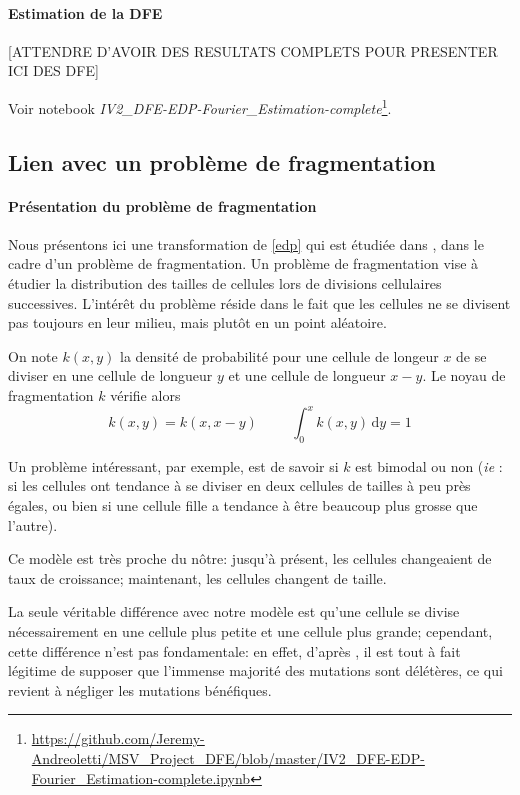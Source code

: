 \documentclass[12pt]{article}
\newcommand{\esp}{\hspace{1cm}}
\newcommand{\ie}{\emph{ie} }
\newcommand{\de}{\,\mathrm{d}}
\begin{document}
\paragraph{Estimation de la DFE}

[ATTENDRE D'AVOIR DES RESULTATS COMPLETS POUR PRESENTER ICI DES DFE]

Voir notebook \emph{IV2\_DFE-EDP-Fourier\_Estimation-complete}\footnote{\url{https://github.com/Jeremy-Andreoletti/MSV_Project_DFE/blob/master/IV2_DFE-EDP-Fourier_Estimation-complete.ipynb}}.

\subsection{Lien avec un problème de fragmentation}

\paragraph{Présentation du problème de fragmentation}
Nous présentons ici une transformation de \eqref{edp} qui est étudiée dans \cite{md1}, \cite{md2} dans le cadre d'un problème de fragmentation. Un problème de fragmentation vise à étudier la distribution des tailles de cellules lors de divisions cellulaires successives. L'intérêt du problème réside dans le fait que les cellules ne se divisent pas toujours en leur milieu, mais plutôt en un point aléatoire.

On note $k(x,y)$ la densité de probabilité pour une cellule de longeur $x$ de se diviser en une cellule de longueur $y$ et une cellule de longueur $x-y$. Le noyau de fragmentation $k$ vérifie alors \[k(x,y)=k(x,x-y)\esp \int_0^xk(x,y)\de y=1\]

Un problème intéressant, par exemple, est de savoir si $k$ est bimodal ou non (\ie: si les cellules ont tendance à se diviser en deux cellules de tailles à peu près égales, ou bien si une cellule fille a tendance à être beaucoup plus grosse que l'autre).

Ce modèle est très proche du nôtre: jusqu'à présent, les cellules changeaient de taux de croissance; maintenant, les cellules changent de taille.

La seule véritable différence avec notre modèle est qu'une cellule se divise nécessairement en une cellule plus petite et une cellule plus grande; cependant, cette différence n'est pas fondamentale: en effet, d'après \cite{rob}, il est tout à fait légitime de supposer que l'immense majorité des mutations sont délétères, ce qui revient à négliger les mutations bénéfiques.
\end{document}
